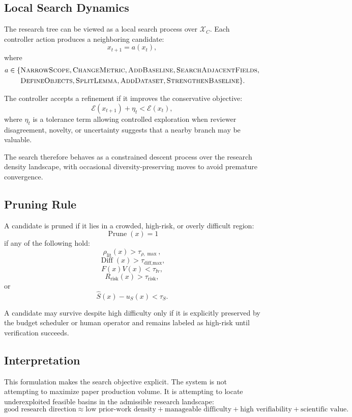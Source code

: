 \documentclass[11pt]{article}
\begin{document}
\subsection{Local Search Dynamics}
The research tree can be viewed as a local search process over $\mathcal{X}_C$. Each controller action produces a neighboring candidate:
$$ x_{t+1} = a(x_t), $$
where
$$ 
\begin{aligned}
a \in \{ &\textsc{NarrowScope}, \textsc{ChangeMetric}, \textsc{AddBaseline}, \textsc{SearchAdjacentFields}, \\
&\textsc{DefineObjects}, \textsc{SplitLemma}, \textsc{AddDataset}, \textsc{StrengthenBaseline} \}.
\end{aligned}
$$

The controller accepts a refinement if it improves the conservative objective:
$$ \mathcal{E}(x_{t+1})+\eta_t < \mathcal{E}(x_t), $$
where $\eta_t$ is a tolerance term allowing controlled exploration when reviewer disagreement, novelty, or uncertainty suggests that a nearby branch may be valuable.

The search therefore behaves as a constrained descent process over the research density landscape, with occasional diversity-preserving moves to avoid premature convergence.

\subsection{Pruning Rule}
A candidate is pruned if it lies in a crowded, high-risk, or overly difficult region:
$$ \operatorname{Prune}(x)=1 $$
if any of the following hold:
$$ \rho_{\text{lit}}(x)>\tau_{\rho,\max}, $$
$$ \operatorname{Diff}(x)>\tau_{\text{diff,max}}, $$
$$ F(x)V(x)<\tau_{\text{fv}}, $$
$$ R_{\text{risk}}(x)>\tau_{\text{risk}}, $$
or
$$ \hat{S}(x)-u_S(x)<\tau_S. $$

A candidate may survive despite high difficulty only if it is explicitly preserved by the budget scheduler or human operator and remains labeled as high-risk until verification succeeds.

\subsection{Interpretation}
This formulation makes the search objective explicit. The system is not attempting to maximize paper production volume. It is attempting to locate underexploited feasible basins in the admissible research landscape:
$$ \text{good research direction} \approx \text{low prior-work density} + \text{manageable difficulty} + \text{high verifiability} + \text{scientific value}. $$
\end{document}
